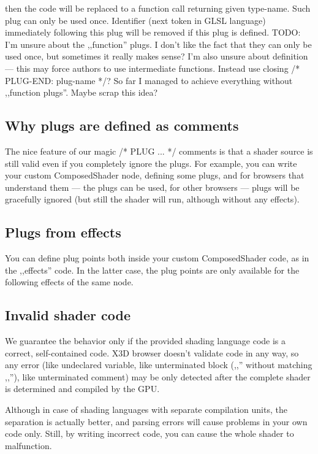\documentclass{acmsiggraph}                     %
\begin{document}
then the code will be replaced to a function call returning given type-name.
Such plug can only be used once.
Identifier (next token in GLSL language) immediately following
this plug will be removed if this plug is defined.
TODO: I'm unsure about the ,,function'' plugs.
I don't like the fact that they can only be used once, but sometimes
it really makes sense?
I'm also unsure about definition --- this may force authors to use
intermediate functions. Instead use closing /* PLUG-END: plug-name */?
So far I managed to achieve everything without ,,function plugs''.
Maybe scrap this idea?

\subsection{Why plugs are defined as comments}

The nice feature of our magic /* PLUG ... */ comments is that a shader source
is still valid even if you completely ignore the plugs. For example,
you can write your custom ComposedShader node, defining some plugs,
and for browsers that understand them --- the plugs can be used,
for other browsers --- plugs will be gracefully ignored (but still
the shader will run, although without any effects).

\subsection{Plugs from effects}

You can define plug points both inside your custom ComposedShader code,
as in the ,,effects'' code. In the latter case, the plug points
are only available for the following effects of the same node.

\subsection{Invalid shader code}

We guarantee the behavior only if the provided shading language code
is a correct, self-contained code.
X3D browser doesn't validate code in any way, so any error (like undeclared
variable, like unterminated block (,,{'' without matching ,,}''),
like unterminated comment) may be only detected after the complete shader
is determined and compiled by the GPU.

Although in case of shading languages with separate compilation units,
the separation is actually better, and parsing errors will cause
problems in your own code only. Still, by writing incorrect code,
you can cause the whole shader to malfunction.
\end{document}
